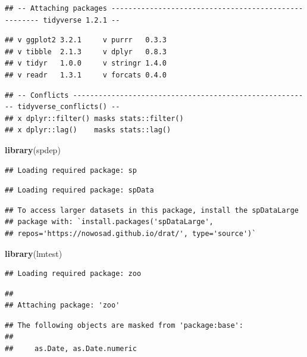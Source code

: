 \documentclass[11pt,]{article}
\newenvironment{Shaded}{\begin{snugshade}}{\end{snugshade}}
\newcommand{\KeywordTok}[1]{\textcolor[rgb]{0.13,0.29,0.53}{\textbf{#1}}}
\newcommand{\NormalTok}[1]{#1}
\begin{document}
\begin{verbatim}
## -- Attaching packages ----------------------------------------------------- tidyverse 1.2.1 --
\end{verbatim}

\begin{verbatim}
## v ggplot2 3.2.1     v purrr   0.3.3
## v tibble  2.1.3     v dplyr   0.8.3
## v tidyr   1.0.0     v stringr 1.4.0
## v readr   1.3.1     v forcats 0.4.0
\end{verbatim}

\begin{verbatim}
## -- Conflicts -------------------------------------------------------- tidyverse_conflicts() --
## x dplyr::filter() masks stats::filter()
## x dplyr::lag()    masks stats::lag()
\end{verbatim}

\begin{Shaded}
\begin{Highlighting}[]
\KeywordTok{library}\NormalTok{(spdep)}
\end{Highlighting}
\end{Shaded}

\begin{verbatim}
## Loading required package: sp
\end{verbatim}

\begin{verbatim}
## Loading required package: spData
\end{verbatim}

\begin{verbatim}
## To access larger datasets in this package, install the spDataLarge
## package with: `install.packages('spDataLarge',
## repos='https://nowosad.github.io/drat/', type='source')`
\end{verbatim}

\begin{Shaded}
\begin{Highlighting}[]
\KeywordTok{library}\NormalTok{(lmtest)}
\end{Highlighting}
\end{Shaded}

\begin{verbatim}
## Loading required package: zoo
\end{verbatim}

\begin{verbatim}
## 
## Attaching package: 'zoo'
\end{verbatim}

\begin{verbatim}
## The following objects are masked from 'package:base':
## 
##     as.Date, as.Date.numeric
\end{verbatim}
\end{document}
